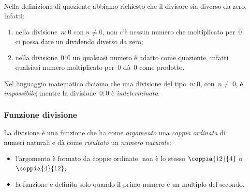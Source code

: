 \begin{osservazione}{}{}
Nella definizione di quoziente abbiamo richiesto che il 
divisore sia diverso da zero. Infatti:
\begin{enumerate}[nosep]
\item nella divisione~\(n:0\) con \(n\neq 0\), non c'è nessun numero che 
moltiplicato per~0 ci possa dare un dividendo diverso da zero;
\item nella divisione~\(0:0\) un qualsiasi numero è adatto come quoziente, 
infatti qualsiasi numero moltiplicato per~0 dà~0 come prodotto.
\end{enumerate}
\end{osservazione}


Nel linguaggio matematico diciamo che una divisione del tipo~\(n:0\), 
con~\(n\neq~0\), è \emph{impossibile}; mentre la divisione~\(0:0\) è 
\emph{indeterminata}.

\subsubsection{Funzione divisione}

La divisione è una funzione che ha come \emph{argomento} una \emph{coppia 
ordinata} di numeri naturali e dà come \emph{risultato} un \emph{numero 
naturale}:

\vspace{.5em}
\begin{minipage}[t]{.48\textwidth}
\begin{center}
\begin{inaccessibleblock}
\end{inaccessibleblock}
\end{center}
\end{minipage}
\hfill
\begin{minipage}[t]{.48\textwidth}
\begin{center}
\begin{inaccessibleblock}
\end{inaccessibleblock}
\end{center}
\end{minipage}

\begin{osservazione}{}{}
\begin{itemize} [nosep]
\item l'argomento è formato da coppie ordinate: non è lo stesso 
\(\coppia{12}{4}\) o \(\coppia{4}{12}\);
\item la funzione è definita solo quando il primo numero è un multiplo
del secondo.
\end{itemize}

\end{osservazione}

